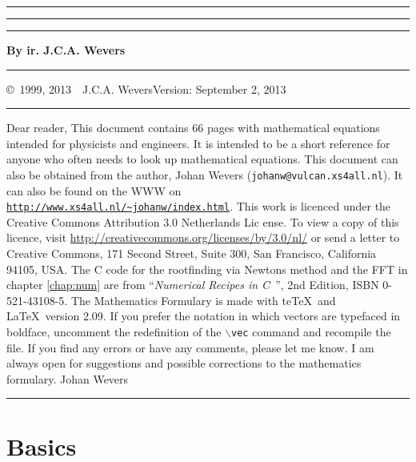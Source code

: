 \documentclass[twoside]{report}
\begin{document}
\thispagestyle{empty}
\hrule
\rule{.4pt}{22.35cm}\hspace*{161.62mm}\rule{.4pt}{22.35cm}
\vspace*{-17cm}
\begin{center}
\Huge
{}
\end{center}
\vspace{2cm}
\centerline{\Large\bf By ir. J.C.A. Wevers}
\vfill
\hrule
\newpage
\thispagestyle{empty}
\copyright~1999, 2013~~J.C.A. Wevers\hfill Version: September 2, 2013
\npar
\hrule
\par
\bigskip
Dear reader,
\npar
This document contains 66 pages with mathematical equations intended for
physicists and engineers. It is intended to be a short reference for anyone
who often needs to look up mathematical equations.
\npar
This document can also be obtained from the author, Johan Wevers ({\tt johanw@vulcan.xs4all.nl}).
\npar
It can also be found on the WWW on 
\href{http://www.xs4all.nl/~johanw}{\tt http://www.xs4all.nl/\~{}johanw/index.html}.
\npar
This work is licenced under the Creative Commons Attribution 3.0 Netherlands Lic
ense.
To view a copy of this licence, visit \href{http://creativecommons.org/licenses/by/3.0/nl/}{http://creativecommons.org/licenses/by/3.0/nl/}
or send a letter to Creative Commons, 171 Second Street, Suite 300,
San Francisco, California 94105, USA.
\npar
The C code for the rootfinding via Newtons method and the FFT in chapter
\ref{chap:num} are from ``{\it Numerical Recipes in C}~'', 2nd Edition,
ISBN 0-521-43108-5.
\npar
The Mathematics Formulary is made with te\TeX\ and \LaTeX\ version 2.09.
\npar
If you prefer the notation in which vectors are typefaced in boldface, uncomment
the redefinition of the {\tt $\backslash$vec} command and recompile the file.
\npar
If you find any errors or have any comments, please let me know. I am always
open for suggestions and possible corrections to the mathematics formulary.
\npar
Johan Wevers
\vfill
\hrule

\newpage

\tableofcontents
\cleardoublepage


\renewcommand{\chaptermark}[1]{\markboth{#1}{#1}}

\chapter{Basics}
\end{document}
